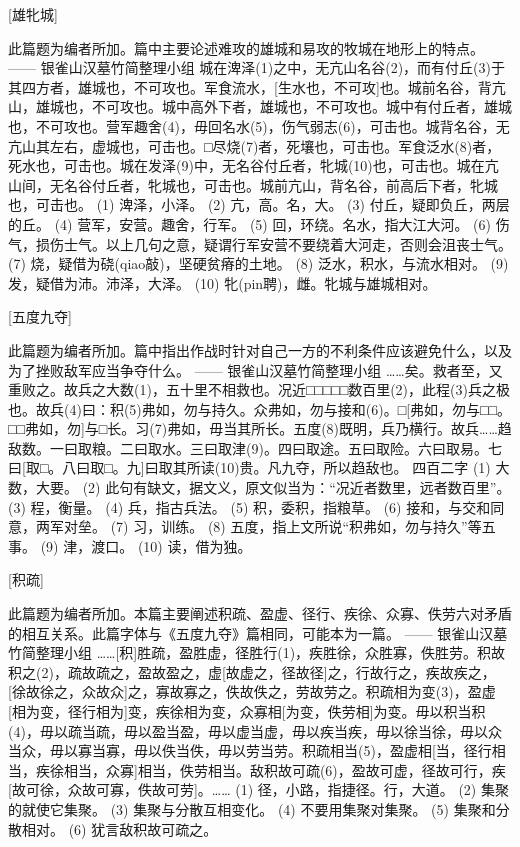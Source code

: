 \documentclass[12pt,UTF8]{ctexbook}
\begin{document}
[雄牝城]

此篇题为编者所加。篇中主要论述难攻的雄城和易攻的牧城在地形上的特点。
—— 银雀山汉墓竹简整理小组
城在渒泽(1)之中，无亢山名谷(2)，而有付丘(3)于其四方者，雄城也，不可攻也。军食流水，[生水也，不可攻]也。城前名谷，背亢山，雄城也，不可攻也。城中高外下者，雄城也，不可攻也。城中有付丘者，雄城也，不可攻也。营军趣舍(4)，毋回名水(5)，伤气弱志(6)，可击也。城背名谷，无亢山其左右，虚城也，可击也。□尽烧(7)者，死壤也，可击也。军食泛水(8)者，死水也，可击也。城在发泽(9)中，无名谷付丘者，牝城(10)也，可击也。城在亢山间，无名谷付丘者，牝城也，可击也。城前亢山，背名谷，前高后下者，牝城也，可击也。
(1) 渒泽，小泽。
(2) 亢，高。名，大。
(3) 付丘，疑即负丘，两层的丘。
(4) 营军，安营。趣舍，行军。
(5) 回，环绕。名水，指大江大河。
(6) 伤气，损伤士气。以上几句之意，疑谓行军安营不要绕着大河走，否则会沮丧士气。
(7) 烧，疑借为硗(qiao敲)，坚硬贫瘠的土地。
(8) 泛水，积水，与流水相对。
(9) 发，疑借为沛。沛泽，大泽。
(10) 牝(pin聘)，雌。牝城与雄城相对。

[五度九夺]

此篇题为编者所加。篇中指出作战时针对自己一方的不利条件应该避免什么，以及为了挫败敌军应当争夺什么。
—— 银雀山汉墓竹简整理小组
……矣。救者至，又重败之。故兵之大数(1)，五十里不相救也。况近□□□□□数百里(2)，此程(3)兵之极也。故兵(4)曰：积(5)弗如，勿与持久。众弗如，勿与接和(6)。□[弗如，勿与□□。□□弗如，勿]与□长。习(7)弗如，毋当其所长。五度(8)既明，兵乃横行。故兵……趋敌数。一曰取粮。二曰取水。三曰取津(9)。四曰取途。五曰取险。六曰取易。七曰[取□。八曰取□。九]曰取其所读(10)贵。凡九夺，所以趋敌也。
四百二字
(1) 大数，大要。
(2) 此句有缺文，据文义，原文似当为：“况近者数里，远者数百里”。
(3) 程，衡量。
(4) 兵，指古兵法。
(5) 积，委积，指粮草。
(6) 接和，与交和同意，两军对垒。
(7) 习，训练。
(8) 五度，指上文所说“积弗如，勿与持久”等五事。
(9) 津，渡口。
(10) 读，借为独。

[积疏]

此篇题为编者所加。本篇主要阐述积疏、盈虚、径行、疾徐、众寡、佚劳六对矛盾的相互关系。此篇字体与《五度九夺》篇相同，可能本为一篇。
—— 银雀山汉墓竹简整理小组
……[积]胜疏，盈胜虚，径胜行(1)，疾胜徐，众胜寡，佚胜劳。积故积之(2)，疏故疏之，盈故盈之，虚[故虚之，径故径]之，行故行之，疾故疾之，[徐故徐之，众故众]之，寡故寡之，佚故佚之，劳故劳之。积疏相为变(3)，盈虚[相为变，径行相为]变，疾徐相为变，众寡相[为变，佚劳相]为变。毋以积当积(4)，毋以疏当疏，毋以盈当盈，毋以虚当虚，毋以疾当疾，毋以徐当徐，毋以众当众，毋以寡当寡，毋以佚当佚，毋以劳当劳。积疏相当(5)，盈虚相[当，径行相当，疾徐相当，众寡]相当，佚劳相当。敌积故可疏(6)，盈故可虚，径故可行，疾[故可徐，众故可寡，佚故可劳]。……
(1) 径，小路，指捷径。行，大道。
(2) 集聚的就使它集聚。
(3) 集聚与分散互相变化。
(4) 不要用集聚对集聚。
(5) 集聚和分散相对。
(6) 犹言敌积故可疏之。
\end{document}

